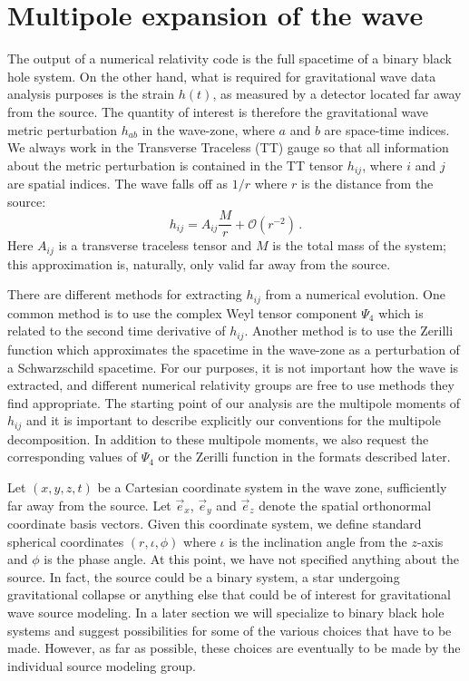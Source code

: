 \documentclass[prd,preprintnumbers,superscriptaddress,eqsecnum]{revtex4}
\numberwithin{equation}{section}
\newcommand{\xhat}{\vec{e}_x}
\newcommand{\yhat}{\vec{e}_y}
\newcommand{\zhat}{\vec{e}_z}
\begin{document}
\section{Multipole expansion of the wave}
\label{sec:multipoles}


The output of a numerical relativity code is the full spacetime of a
binary black hole system. On the other hand, what is required for
gravitational wave data analysis purposes is the strain $h(t)$, as
measured by a detector located far away from the source.  The quantity
of interest is therefore the gravitational wave metric perturbation
$h_{ab}$ in the wave-zone, where $a$ and $b$ are space-time indices.
We always work in the Transverse Traceless (TT) gauge so that all
information about the metric perturbation is contained in the TT
tensor $h_{ij}$, where $i$ and $j$ are spatial indices.  The wave
falls off as $1/r$ where $r$ is the distance from the source:
\begin{equation}
  \label{eq:1}
  h_{ij} = A_{ij}\frac{M}{r} + \mathcal{O}\left(r^{-2}\right)\,.
\end{equation}
Here $A_{ij}$ is a transverse traceless tensor and $M$ is the total
mass of the system; this approximation is, naturally, only valid far
away from the source.

There are different methods for extracting $h_{ij}$ from a numerical
evolution.  One common method is to use the complex Weyl tensor
component $\Psi_4$ which is related to the second time derivative of
$h_{ij}$. Another method is to use the Zerilli function which
approximates the spacetime in the wave-zone as a perturbation of a
Schwarzschild spacetime.  For our purposes, it is not important how
the wave is extracted, and different numerical relativity groups are
free to use methods they find appropriate.  The starting point of our
analysis are the multipole moments of $h_{ij}$ and it is important to
describe explicitly our conventions for the multipole decomposition.
In addition to these multipole moments, we also request the
corresponding values of $\Psi_4$ or the Zerilli function in the
formats described later.

Let $(x,y,z,t)$ be a Cartesian coordinate system in the wave zone,
sufficiently far away from the source. Let $\xhat$, $\yhat$ and
$\zhat$ denote the spatial orthonormal coordinate basis vectors.
Given this coordinate system, we define standard spherical coordinates
$(r,\iota,\phi)$ where $\iota$ is the inclination angle from the
$z$-axis and $\phi$ is the phase angle.  At this point, we have not
specified anything about the source.  In fact, the source could be a
binary system, a star undergoing gravitational collapse or anything
else that could be of interest for gravitational wave source modeling.
In a later section we will specialize to binary black hole systems and
suggest possibilities for some of the various choices that have to be
made.  However, as far as possible, these choices are eventually to be
made by the individual source modeling group.
\end{document}
